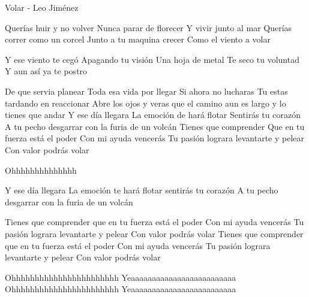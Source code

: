 Volar - Leo Jiménez

Querías huir y no volver
Nunca parar de florecer
Y vivir junto al mar
Querías correr como un corcel
Junto a tu maquina crecer
Como el viento a volar

Y ese viento te cegó
Apagando tu visión
Una hoja de metal
Te seco tu voluntad
Y aun así ya te postro

De que servia planear
Toda esa vida por llegar
Si ahora no lucharas
Tu estas tardando en reaccionar
Abre los ojos y veras que el camino aun es largo y lo tienes que andar
Y ese día llegara
La emoción de hará flotar
Sentirás tu corazón
A tu pecho desgarrar con la furia de un volcán
Tienes que comprender
Que en tu fuerza está el poder
Con mi ayuda vencerás
Tu pasión lograra levantarte y pelear
Con valor podrás volar



Ohhhhhhhhhhhhhh

Y ese día llegara
La emoción te hará flotar sentirás tu corazón
A tu pecho desgarrar con la furia de un volcán

Tienes que comprender que en tu fuerza está el poder
Con mi ayuda vencerás
Tu pasión lograra levantarte y pelear
Con valor podrás volar
Tienes que comprender que en tu fuerza está el poder
Con mi ayuda vencerás
Tu pasión lograra levantarte y pelear
Con valor podrás volar

Ohhhhhhhhhhhhhhhhhhhhhhh
Yeaaaaaaaaaaaaaaaaaaaaaaaaa
Ohhhhhhhhhhhhhhhhhhhhhhh
Yeaaaaaaaaaaaaaaaaaaaaaaaaa
